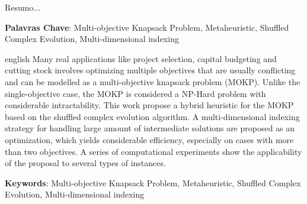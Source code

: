 

\begin{resumo}
Resumo...
\vspace{\onelineskip}

\noindent
\textbf{Palavras Chave}:
Multi-objective Knapsack Problem,
Metaheuristic,
Shuffled Complex Evolution,
Multi-dimensional indexing
\end{resumo}

\begin{resumo}[Abstract]
 \begin{otherlanguage*}{english}
Many real applications like project selection, capital budgeting and cutting stock involves optimizing multiple objectives that are usually conflicting and can be modelled as a multi-objective knapsack problem (MOKP).
Unlike the single-objective case, the MOKP is considered a NP-Hard problem with
considerable intractability.
This work propose a hybrid heuristic for the MOKP based on the
shuffled complex evolution algorithm.
A multi-dimensional indexing strategy for handling large amount of intermediate
solutions are proposed as an optimization, which yields considerable
efficiency, especially on cases with more than two objectives.
A series of computational experiments show the applicability of the proposal
to several types of instances.

\noindent
\textbf{Keywords}:
Multi-objective Knapsack Problem,
Metaheuristic,
Shuffled Complex Evolution,
Multi-dimensional indexing
\end{otherlanguage*}
\end{resumo}



